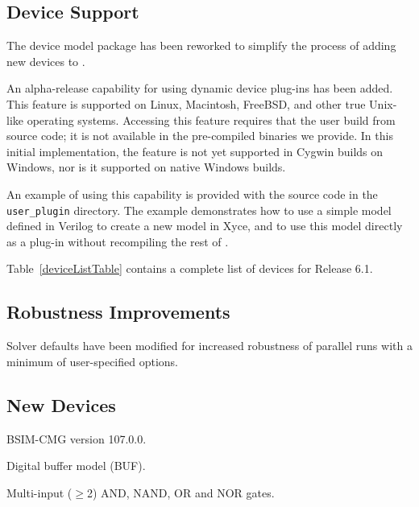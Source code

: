 \documentclass[11pt,report,strict]{SANDreport}
\begin{document}
\subsection{Device Support}

The device model package has been reworked to simplify the process of
adding new devices to \Xyce{}.

An alpha-release capability for using dynamic device plug-ins has
been added.  This feature is supported on Linux, Macintosh, FreeBSD,
and other true Unix-like operating systems.  Accessing this feature
requires that the user build \Xyce{} from source code; it is not
available in the pre-compiled binaries we provide.  In this initial
implementation, the feature is not yet supported in Cygwin builds on
Windows, nor is it supported on native Windows builds.

An example of using this capability is provided with the \Xyce{} source code in
the \texttt{user\_plugin} directory.  The example demonstrates how to use a
simple model defined in Verilog to create a new model in Xyce, and to use this
model directly as a plug-in without recompiling the rest of \Xyce{}.

Table~\ref{deviceListTable} contains a complete list of devices for \Xyce{}
Release 6.1.



\subsection{Robustness Improvements}
\begin{XyceItemize}
\item Solver defaults have been modified for increased robustness of
  parallel runs with a minimum of user-specified options.
\end{XyceItemize}

\subsection{New Devices}
\begin{XyceItemize}
\item BSIM-CMG version 107.0.0.
\item Digital buffer model (BUF).
\item Multi-input ($\geq$2) AND, NAND, OR and NOR gates.
\end{XyceItemize}
\end{document}
